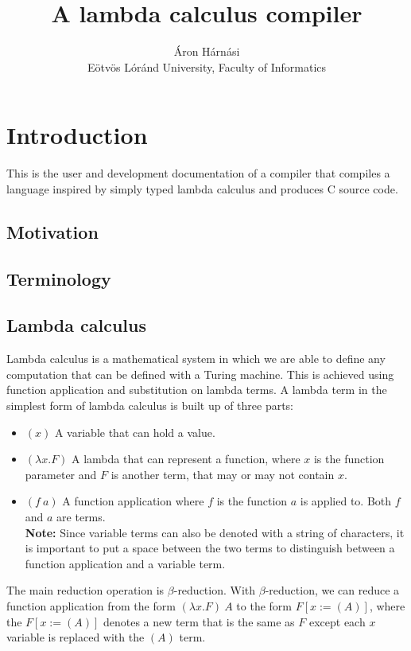 \documentclass[12pt]{article}
\title{A lambda calculus compiler}
\author{Áron Hárnási \\
    \normalsize Eötvös Lóránd University, Faculty of Informatics}
\begin{document}
\linespread{1}
\maketitle
\pagebreak
\tableofcontents
\pagebreak

\section{Introduction}

This is the user and development documentation of a compiler that compiles a
language inspired by simply typed lambda calculus and produces C source code.

\subsection{Motivation} %
\subsection{Terminology} %

\subsection{Lambda calculus}

Lambda calculus is a mathematical system in which we are able to define any
computation that can be defined with a Turing machine. This is achieved using
function application and substitution on lambda terms. A lambda term in the
simplest form of lambda calculus is built up of three parts:
\begin{itemize}
    \item $(x)$ A variable that can hold a value.
    \item $(\lambda x. F)$ A lambda that can represent a function, where $x$
        is the function parameter and $F$ is another term, that may or 
        may not contain $x$.
    \item $(f\:a)$ A function application where $f$ is the function $a$ is
        applied to. Both $f$ and $a$ are terms. \\ \textbf{Note:} Since variable
        terms can also be denoted with a string of characters, it is important
        to put a space between the two terms to distinguish between a function
        application and a variable term.
\end{itemize}
The main reduction operation is $\beta$-reduction. With $\beta$-reduction, we
can reduce a function application from the form $(\lambda x. F)\:A$ to the
form $F[x := (A)]$, where the $F[x := (A)]$ denotes a new term that is the same
as $F$ except each $x$ variable is replaced with the $(A)$ term.
\end{document}

